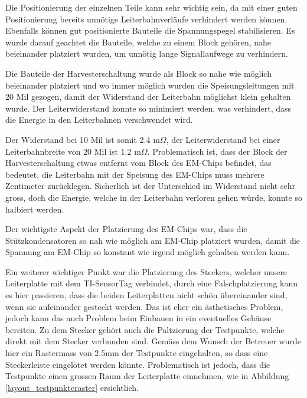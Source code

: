 Die Positionierung der einzelnen Teile kann sehr wichtig sein, da mit einer guten Positionierung bereits unnötige Leiterbahnverläufe verhindert werden können. Ebenfalls können gut positionierte Bauteile die Spannungspegel stabilisieren. Es wurde darauf geachtet die Bauteile, welche zu einem Block gehören, nahe beieinander platziert wurden, um unnötig lange Signallaufwege zu verhindern.

Die Bauteile der Harvesterschaltung wurde als Block so nahe wie möglich beieinander platziert und wo immer möglich wurden die Speisungsleitungen mit 20 Mil gezogen, damit der Widerstand der Leiterbahn möglichst klein gehalten wurde. Der Leiterwiderstand konnte so minimiert werden, was verhindert, dass die Energie in den Leiterbahnen verschwendet wird.


Der Widerstand bei 10 Mil ist somit 2.4 m$\Omega$, 
der Leiterwiderstand bei einer Leiterbahnbreite von 20 Mil ist 1.2 m$\Omega$. 
Problematisch ist, dass der Block der Harvesterschaltung etwas entfernt vom Block des EM-Chips befindet, das bedeutet, die Leiterbahn mit der Speisung des EM-Chips muss mehrere Zentimeter zurücklegen. Sicherlich ist der Unterschied im Widerstand nicht sehr gross, doch die Energie, welche in der Leiterbahn verloren gehen würde, konnte so halbiert werden.

Der wichtigste Aspekt der Platzierung des EM-Chips war, dass die Stützkondensatoren so nah wie möglich am EM-Chip platziert wurden, damit die Spannung am EM-Chip so konstant wie irgend möglich gehalten werden kann.

Ein weiterer wichtiger Punkt war die Platzierung des Steckers, welcher unsere Leiterplatte mit dem TI-SensorTag verbindet, durch eine Falschplatzierung kann es hier passieren, dass die beiden Leiterplatten nicht schön übereinander sind, wenn sie aufeinander gesteckt werden. Das ist eher ein ästhetisches Problem, jedoch kann das auch Problem beim Einbauen in ein eventuelles Gehäuse bereiten. Zu dem Stecker gehört auch die Paltzierung der Testpunkte, welche direkt mit dem Stecker verbunden sind. Gemäss dem Wunsch der Betreuer wurde hier ein Rastermass von 2.5mm der Testpunkte eingehalten, so dass eine Steckerleiste eingelötet werden könnte. Problematisch ist jedoch, dass die Testpunkte einen grossen Raum der Leiterplatte einnehmen, wie in Abbildung \ref{layout_testpunkteraster} ersichtlich.

